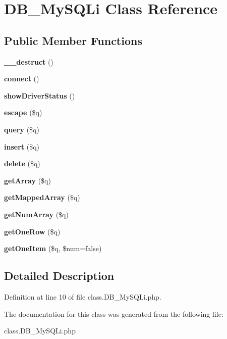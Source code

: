 \section{DB\_\-MySQLi Class Reference}
\label{classDB__MySQLi}
\subsection*{Public Member Functions}
\begin{CompactItemize}
\item 
{\bf \_\-\_\-destruct} ()\label{classDB__MySQLi_5b7ac5916566ed991e3837626df5449a}

\item 
{\bf connect} ()\label{classDB__MySQLi_39c94023315f2445b996c860259709f5}

\item 
{\bf showDriverStatus} ()\label{classDB__MySQLi_9ef0ae5554d121c63dc45f4cce06e9cb}

\item 
{\bf escape} (\$q)\label{classDB__MySQLi_5655311dcd772ed641b42675c0eed2b2}

\item 
{\bf query} (\$q)\label{classDB__MySQLi_9f29f0914b8b43ce0c3224dcfcbf7ed0}

\item 
{\bf insert} (\$q)\label{classDB__MySQLi_beea02988d4b6eb36364c1c8dad0f0f9}

\item 
{\bf delete} (\$q)\label{classDB__MySQLi_45460e98bd0255074a45c0f6620d911b}

\item 
{\bf getArray} (\$q)\label{classDB__MySQLi_92da621cbf8060841d05739fcb6fee30}

\item 
{\bf getMappedArray} (\$q)\label{classDB__MySQLi_d75bd91a1c66604cf7079732329d1cb9}

\item 
{\bf getNumArray} (\$q)\label{classDB__MySQLi_5cc1b932a0fe95d39f831b50babefed4}

\item 
{\bf getOneRow} (\$q)\label{classDB__MySQLi_e9f9e83225cd131fb4b78fce9d6d6cbd}

\item 
{\bf getOneItem} (\$q, \$num=false)\label{classDB__MySQLi_e6738d25338491e90e1292f7a11884cd}

\end{CompactItemize}


\subsection{Detailed Description}


Definition at line 10 of file class.DB\_\-MySQLi.php.

The documentation for this class was generated from the following file:\begin{CompactItemize}
\item 
class.DB\_\-MySQLi.php\end{CompactItemize}
